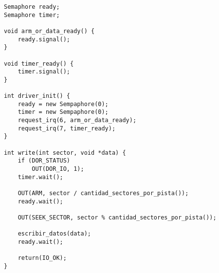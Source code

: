 \subsubsection{}
\begin{codesnippet}
\begin{verbatim}
Semaphore ready;
Semaphore timer;

void arm_or_data_ready() {
    ready.signal();
}

void timer_ready() {
    timer.signal();
}

int driver_init() {
    ready = new Sempaphore(0);
    timer = new Sempaphore(0);
    request_irq(6, arm_or_data_ready);
    request_irq(7, timer_ready);
}

int write(int sector, void *data) {
    if (DOR_STATUS)
        OUT(DOR_IO, 1);
    timer.wait();

    OUT(ARM, sector / cantidad_sectores_por_pista());
    ready.wait();

    OUT(SEEK_SECTOR, sector % cantidad_sectores_por_pista());

    escribir_datos(data);
    ready.wait();

    return(IO_OK);
}
\end{verbatim}
\end{codesnippet}